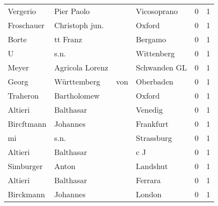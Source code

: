 \documentclass[10pt,a4paper,landscape]{article}
\begin{document}
\begin{longtable}{llllrr}
                 Vergerio &                         Pier Paolo &             &                                 Vicosoprano &          0 &         1 \\
               Froschauer &                     Christoph jun. &             &                                      Oxford &          0 &         1 \\
                    Borte &                           tt Franz &             &                                     Bergamo &          0 &         1 \\
                        U &                               s.n. &             &                                  Wittenberg &          0 &         1 \\
                    Meyer &                    Agricola Lorenz &             &                                Schwanden GL &          0 &         1 \\
                    Georg &                        Württemberg &         von &                                   Oberbaden &          0 &         1 \\
                 Traheron &                        Bartholomew &             &                                      Oxford &          0 &         1 \\
                  Altieri &                          Balthasar &             &                                     Venedig &          0 &         1 \\
               Bircftmann &                           Johannes &             &                                   Frankfurt &          0 &         1 \\
                       mi &                               s.n. &             &                                  Strassburg &          0 &         1 \\
                  Altieri &                          Balthasar &             &                                         c J &          0 &         1 \\
                Simburger &                              Anton &             &                                    Landshut &          0 &         1 \\
                  Altieri &                          Balthasar &             &                                     Ferrara &          0 &         1 \\
                Birckmann &                           Johannes &             &                                      London &          0 &         1 \\

\end{longtable}
\end{document}
